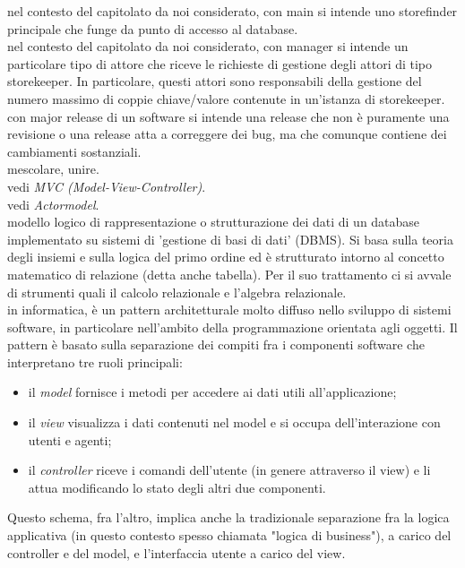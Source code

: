 \documentclass{scalatekids-article}
\begin{document}
   nel contesto del capitolato da noi considerato, con main si intende uno storefinder principale che funge da punto di accesso al database.
  \\
  
   nel contesto del capitolato da noi considerato, con manager si intende un particolare tipo di attore che riceve le richieste di gestione degli attori di tipo storekeeper. In particolare, questi attori sono responsabili della gestione del numero massimo di coppie chiave/valore contenute in un’istanza di storekeeper.
  \\

   con major release di un software si intende una release che non è puramente una revisione o una release atta a correggere dei bug, ma che comunque contiene dei cambiamenti sostanziali.
  \\

   mescolare, unire.
  \\
  
   vedi \textit{MVC (Model-View-Controller)}.
  \\

   vedi \textit{Actormodel}.
  \\

   modello logico di rappresentazione o strutturazione dei dati di un database implementato su sistemi di 'gestione di basi di dati' (DBMS).
  Si basa sulla teoria degli insiemi e sulla logica del primo ordine ed è strutturato intorno al concetto matematico di relazione (detta anche tabella). Per il suo trattamento ci si avvale di strumenti quali il calcolo relazionale e l'algebra relazionale.
  \\
  
   in informatica, è un pattern architetturale molto diffuso nello sviluppo di sistemi software, in particolare nell'ambito della programmazione orientata agli oggetti.
  Il pattern è basato sulla separazione dei compiti fra i componenti software che interpretano tre ruoli principali:
  \begin{itemize}
  \item il \textit{model} fornisce i metodi per accedere ai dati utili all'applicazione;
	\item il \textit{view} visualizza i dati contenuti nel model e si occupa dell'interazione con utenti e agenti;
	\item il \textit{controller} riceve i comandi dell'utente (in genere attraverso il view) e li attua modificando lo stato degli altri due componenti.
  \end{itemize}
  Questo schema, fra l'altro, implica anche la tradizionale separazione fra la logica applicativa (in questo contesto spesso chiamata "logica di business"), a carico del controller e del model, e l'interfaccia utente a carico del view.
  \\
\end{document}
